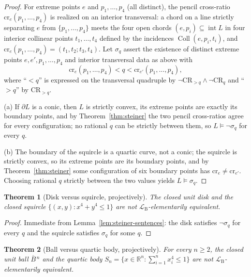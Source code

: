 \documentclass[11pt]{amsart}
\newtheorem{theorem}{Theorem}[section]
\theoremstyle{definition}
\newcommand{\R}{\mathbb{R}}
\newcommand{\LB}{\mathcal{L}_{\mathrm{B}}}
\newcommand{\Coll}{\operatorname{Coll}}
\newcommand{\interior}{\operatorname{int}}
\newcommand{\cf}{\mathrm{cr}}
\newcommand{\Ball}{\overline{B}{}^{\,n}}
\begin{document}
\begin{proof}
For extreme points $e$ and $p_1,\dots,p_4$ (all distinct), the pencil
cross-ratio $\cf_e(p_1,\dots,p_4)$ is realized on an interior transversal:
a chord on a line strictly separating $e$ from $\{p_1,\dots,p_4\}$ meets the
four open chords $(e,p_i)\subseteq\interior L$ in four interior collinear
points $t_1,\dots,t_4$ defined by the incidences $\Coll(e,p_i,t_i)$, and
$\cf_e(p_1,\dots,p_4)=(t_1,t_2;t_3,t_4)$. Let $\sigma_q$ assert the
existence of distinct extreme points $e,e',p_1,\dots,p_4$ and interior
transversal data as above with
\[
\cf_e(p_1,\dots,p_4)<q<\cf_{e'}(p_1,\dots,p_4),
\]
where ``$<q$'' is expressed on the transversal quadruple by
$\neg\mathrm{CR}_{>q}\wedge\neg\mathrm{CR}_q$ and ``$>q$'' by
$\mathrm{CR}_{>q}$.

(a) If $\partial L$ is a conic, then $L$ is strictly convex, its extreme
points are exactly its boundary points, and by Theorem~\ref{thm:steiner} the
two pencil cross-ratios agree for every configuration; no rational $q$ can
be strictly between them, so $L\models\neg\sigma_q$ for every $q$.

(b) The boundary of the squircle is a quartic curve, not a conic; the
squircle is strictly convex, so its extreme points are its boundary points,
and by Theorem~\ref{thm:steiner} some configuration of six boundary points
has $\cf_e\ne\cf_{e'}$. Choosing rational $q$ strictly between the two
values yields $L\models\sigma_q$.
\end{proof}

\begin{theorem}[Disk versus squircle, projectively]\label{thm:squircle-LB}
The closed unit disk and the closed
squircle $\{(x,y):x^4+y^4\le1\}$ are not $\LB$-elementarily equivalent.
\end{theorem}

\begin{proof}
Immediate from Lemma~\ref{lem:steiner-sentences}: the disk satisfies
$\neg\sigma_q$ for every $q$ and the squircle satisfies $\sigma_q$ for some
$q$.
\end{proof}

\begin{theorem}[Ball versus quartic body, projectively]\label{thm:ball-LB}
For every $n\ge2$, the closed unit ball
$\Ball$ and the quartic body $S_n=\{x\in\R^n:\sum_{i=1}^nx_i^4\le1\}$ are
not $\LB$-elementarily equivalent.
\end{theorem}
\end{document}
